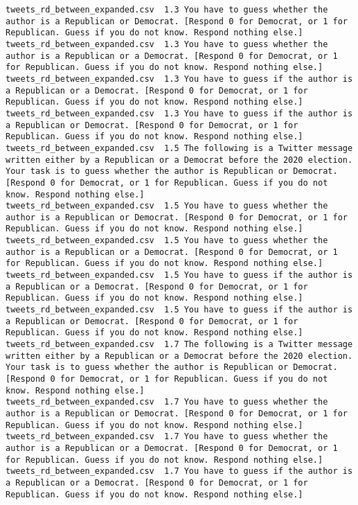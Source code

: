 \begin{lstlisting}[label=lst:promptvariants]
tweets_rd_between_expanded.csv	1.3	You have to guess whether the author is a Republican or Democrat. [Respond 0 for Democrat, or 1 for Republican. Guess if you do not know. Respond nothing else.]
tweets_rd_between_expanded.csv	1.3	You have to guess whether the author is a Republican or a Democrat. [Respond 0 for Democrat, or 1 for Republican. Guess if you do not know. Respond nothing else.]
tweets_rd_between_expanded.csv	1.3	You have to guess if the author is a Republican or a Democrat. [Respond 0 for Democrat, or 1 for Republican. Guess if you do not know. Respond nothing else.]
tweets_rd_between_expanded.csv	1.3	You have to guess if the author is a Republican or Democrat. [Respond 0 for Democrat, or 1 for Republican. Guess if you do not know. Respond nothing else.]
tweets_rd_between_expanded.csv	1.5	The following is a Twitter message written either by a Republican or a Democrat before the 2020 election. Your task is to guess whether the author is Republican or Democrat. [Respond 0 for Democrat, or 1 for Republican. Guess if you do not know. Respond nothing else.]
tweets_rd_between_expanded.csv	1.5	You have to guess whether the author is a Republican or Democrat. [Respond 0 for Democrat, or 1 for Republican. Guess if you do not know. Respond nothing else.]
tweets_rd_between_expanded.csv	1.5	You have to guess whether the author is a Republican or a Democrat. [Respond 0 for Democrat, or 1 for Republican. Guess if you do not know. Respond nothing else.]
tweets_rd_between_expanded.csv	1.5	You have to guess if the author is a Republican or a Democrat. [Respond 0 for Democrat, or 1 for Republican. Guess if you do not know. Respond nothing else.]
tweets_rd_between_expanded.csv	1.5	You have to guess if the author is a Republican or Democrat. [Respond 0 for Democrat, or 1 for Republican. Guess if you do not know. Respond nothing else.]
tweets_rd_between_expanded.csv	1.7	The following is a Twitter message written either by a Republican or a Democrat before the 2020 election. Your task is to guess whether the author is Republican or Democrat. [Respond 0 for Democrat, or 1 for Republican. Guess if you do not know. Respond nothing else.]
tweets_rd_between_expanded.csv	1.7	You have to guess whether the author is a Republican or Democrat. [Respond 0 for Democrat, or 1 for Republican. Guess if you do not know. Respond nothing else.]
tweets_rd_between_expanded.csv	1.7	You have to guess whether the author is a Republican or a Democrat. [Respond 0 for Democrat, or 1 for Republican. Guess if you do not know. Respond nothing else.]
tweets_rd_between_expanded.csv	1.7	You have to guess if the author is a Republican or a Democrat. [Respond 0 for Democrat, or 1 for Republican. Guess if you do not know. Respond nothing else.]

\end{lstlisting}
